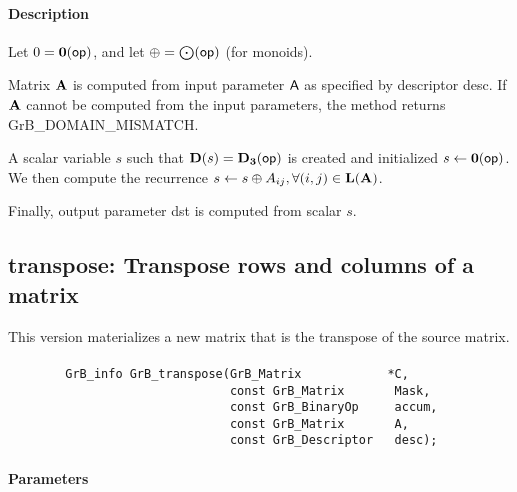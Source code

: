\paragraph{Description}


Let $0 = \bold{0}({\sf op})$, and let $\oplus = \bigodot({\sf op})$ (for monoids).

Matrix ${\bf A}$ is computed from input parameter ${\sf A}$ as
specified by descriptor {\sf desc}. If ${\bf A}$ cannot be computed
from the input parameters, the method returns {\sf GrB\_DOMAIN\_MISMATCH}.

A scalar variable $s$ such that $\bold{D}(s) = \bold{D_3}({\sf op})$ is
created and initialized $s \leftarrow \bold{0}({\sf op})$. 
We then compute the recurrence $s \leftarrow s \oplus A_{ij}, \forall (i, j) \in \bold{L}({\bf A})$.

Finally, output parameter {\sf dst} is computed from scalar $s$.


\subsection{{\sf transpose}: Transpose rows and columns of a matrix}

This version materializes a new matrix that is the transpose of the source matrix.


\paragraph{\syntax}

\begin{verbatim}
        GrB_info GrB_transpose(GrB_Matrix            *C,
                               const GrB_Matrix       Mask,
                               const GrB_BinaryOp     accum,
                               const GrB_Matrix       A,
                               const GrB_Descriptor   desc);
\end{verbatim}

\paragraph{Parameters}


